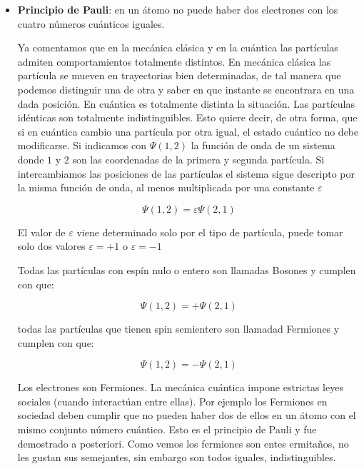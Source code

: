 \begin{itemize}
	\item \textbf{Principio de Pauli}: en un átomo no puede haber dos electrones con los cuatro números cuánticos iguales.
	
Ya comentamos que en la mecánica clásica y en la cuántica las partículas admiten comportamientos totalmente distintos. En mecánica clásica las partícula se mueven en trayectorias bien determinadas, de tal manera que podemos distinguir una de otra y saber en que instante se encontrara en una dada posición. En cuántica es totalmente distinta la situación. Las partículas idénticas son totalmente indistinguibles. Esto quiere decir, de otra forma, que si en cuántica cambio una partícula por otra igual, el estado cuántico no debe modificarse. Si indicamos con $\Psi(1,2)$ la función de onda de un sistema donde $1$ y $2$ son las coordenadas de la primera y segunda partícula. Si intercambiamos las posiciones de las partículas el sistema sigue descripto por la misma función de onda, al menos multiplicada por una constante $\varepsilon$

\begin{equation*}
	\Psi(1,2)=\varepsilon\Psi(2,1)
\end{equation*}

El valor de $\varepsilon$ viene determinado solo por el tipo de partícula, puede tomar solo dos valores $\varepsilon=+1$ o $\varepsilon=-1$ 

Todas las partículas con espín nulo o entero son llamadas Bosones y cumplen con que:

\begin{equation*}
	\Psi(1,2)=+\Psi(2,1)
\end{equation*}


todas las partículas que tienen spin semientero son llamadad Fermiones y cumplen con que:

\begin{equation*}
	\Psi(1,2)=-\Psi(2,1)
\end{equation*}

Los electrones son Fermiones. La mecánica cuántica impone estrictas leyes sociales (cuando interactúan entre ellas). Por ejemplo los Fermiones en sociedad deben cumplir que no pueden haber dos de ellos en un átomo con el mismo conjunto número cuántico. Esto es el principio de Pauli y fue demostrado a posteriori. Como vemos los fermiones son entes ermitaños, no les gustan sus semejantes, sin embargo son todos iguales, indistinguibles.	
	

\end{itemize}
